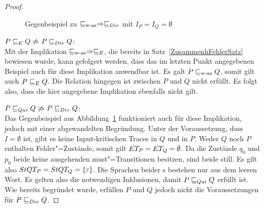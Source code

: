 \begin{proof}
\begin{figure}[htbp]
\begin{center}
      \caption{Gegenbeispiel zu $\sqsubseteq _{\mathrm{w}\text{-}\mathrm{as}} \Rightarrow  \sqsubseteq  _{Div}$ mit $I_P = I_Q =
      \emptyset$}
      \label{wasDivGegenBsp}
    \end{center}
  \end{figure}

  $P  \sqsubseteq  _E Q \not\Rightarrow P  \sqsubseteq  _{Div} Q$:\\
  Mit der Implikation $\sqsubseteq _{\mathrm{w}\text{-}\mathrm{as}} \Rightarrow  \sqsubseteq  _E$, die bereits in
  Satz~\ref{ZusammenhFehlerSatz} bewiesen wurde, kann gefolgert werden, dass
  das im letzten Punkt angegebenen Beispiel auch für diese Implikation
  anwendbar ist. Es galt $P \sqsubseteq _{\mathrm{w}\text{-}\mathrm{as}} Q$, somit gilt auch $P  \sqsubseteq  _E Q$. Die
  Relation \DRel{} hingegen ist zwischen $P$ und $Q$ nicht erfüllt. Es folgt
  also, dass die hier angegebene Implikation ebenfalls nicht gilt.

  $P  \sqsubseteq  _{Qui} Q \not\Rightarrow P  \sqsubseteq  _{Div} Q$:\\
  Das Gegenbeispiel aus Abbildung~\ref{wasDivGegenBsp} funktioniert auch für
  diese Implikation, jedoch mit einer abgewandelten Begründung. Unter der
  Voraussetzung, dass $I=\emptyset$ ist, gibt es keine Input-kritischen Traces
  in $Q$ und in $P$. Weder $Q$ noch $P$ enthalten Fehler"=Zustände, somit gilt
  $ET _P = ET _Q = \emptyset$. Da die Zustände $q_0$ und $p_0$ beide keine
  ausgehenden must"=Transitionen besitzen, sind beide still. Es gilt also
  $StQT _P = StQT _Q = \{\varepsilon\}$. Die Sprachen beider \MEIO{}s
  bestehen nur aus dem leeren Wort. Es gelten also die notwendigen
  Inklusionen, damit $P  \sqsubseteq  _{Qui} Q$ erfüllt ist. Wie bereits begründet wurde,
  erfüllen $P$ und $Q$ jedoch nicht die Voraussetzungen für $P  \sqsubseteq  _{Div} Q$.


\end{proof}
